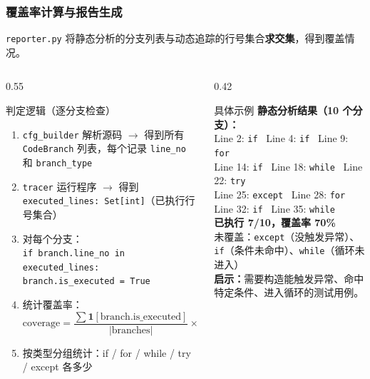 \documentclass[presentation,aspectratio=169]{ctexbeamer}
\begin{document}
\begin{frame}
\frametitle{覆盖率计算与报告生成}
{\small \texttt{reporter.py} 将静态分析的分支列表与动态追踪的行号集合\textbf{求交集}，得到覆盖情况。}

\vspace{0.1cm}
\begin{columns}[T]
\begin{column}{0.55\textwidth}
\begin{block}{\small 判定逻辑（逐分支检查）}
{\scriptsize
\begin{enumerate}\setlength{\itemsep}{1pt}
    \item \texttt{cfg\_builder} 解析源码 $\rightarrow$ 得到所有 \texttt{CodeBranch} 列表，每个记录 \texttt{line\_no} 和 \texttt{branch\_type}
    \item \texttt{tracer} 运行程序 $\rightarrow$ 得到 \texttt{executed\_lines: Set[int]}（已执行行号集合）
    \item 对每个分支：\\
    \quad \texttt{if branch.line\_no in executed\_lines:}\\
    \quad\quad \texttt{branch.is\_executed = True}
    \item 统计覆盖率：
    \[
        \text{coverage} = \frac{\sum \mathbf{1}[\text{branch.is\_executed}]}{|\text{branches}|} \times 100\%
    \]
    \item 按类型分组统计：if / for / while / try / except 各多少
\end{enumerate}}
\end{block}
\end{column}
\begin{column}{0.42\textwidth}
\begin{exampleblock}{\small 具体示例}
{\scriptsize
\textbf{静态分析结果（10 个分支）：}\\
Line 2: \texttt{if} \checkmark~Line 4: \texttt{if} \checkmark~Line 9: \texttt{for} \checkmark\\
Line 14: \texttt{if} \checkmark~Line 18: \texttt{while} \checkmark~Line 22: \texttt{try} \checkmark\\
Line 25: \texttt{except} \textcolor{red}{\texttimes}~Line 28: \texttt{for} \checkmark\\
Line 32: \texttt{if} \textcolor{red}{\texttimes}~Line 35: \texttt{while} \textcolor{red}{\texttimes}\\[3pt]
\textbf{已执行 7/10，覆盖率 70\%}\\[3pt]
未覆盖：\texttt{except}（没触发异常）、\texttt{if}（条件未命中）、\texttt{while}（循环未进入）\\[3pt]
\textbf{启示：}需要构造能触发异常、命中特定条件、进入循环的测试用例。}
\end{exampleblock}
\end{column}
\end{columns}
\end{frame}
\end{document}
